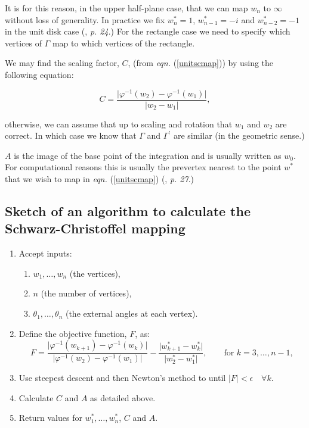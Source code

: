 \documentclass[a4paper,10pt]{amsart}
\newcommand{\sch}{Schwarz-Christoffel }
\newcommand{\eqn}[1]{\emph{eqn.} (\ref{#1})}
\newcommand{\phiinv}{\phi^{-1}}
\renewcommand{\phi}{\varphi}
\begin{document}
It is for this reason, in the upper half-plane case, that we can map $w_n$ to $\infty$ without loss of generality. In practice we fix $w^*_n=1$, $w^*_{n-1}=-i$ and $w^*_{n-2}=-1$ in the unit disk case (\cite{driscoll}, \emph{p. 24}.) For the rectangle case we need to specify which vertices of $\Gamma$ map to which vertices of the rectangle.

We may find the scaling factor, $C$, (from \eqn{unitscmap}) by using the following equation:

\begin{equation}
C=\frac{\vert \phiinv(w_2)-\phiinv(w_1)\vert}{\vert w_2 - w_1\vert},
\end{equation}

otherwise, we can assume that up to scaling and rotation that $w_1$ and $w_2$ are correct. In which case we know that $\Gamma$ and $\Gamma^\prime$ are similar (in the geometric sense.) 

$A$ is the image of the base point of the integration and is usually written as $w_0$. For computational reasons this is usually the prevertex nearest to the point $w^*$ that we wish to map in \eqn{unitscmap}  (\cite{driscoll}, \emph{p. 27}.)


\subsection{Sketch of an algorithm to calculate the \sch mapping}
\label{algorithmsketch}
\begin{enumerate}
\item Accept inputs:
   \begin{enumerate} 
      \item $w_1,\dots,w_n$ (the vertices),
      \item $n$ (the number of vertices),
      \item $\theta_1,\dots,\theta_n$ (the external angles at each vertex).
   \end{enumerate}
\item Define the objective function, $F$, as:
 \begin{equation*}
F=\frac{\vert \phiinv(w_{k+1}) -  \phiinv(w_k) \vert}{\vert \phiinv(w_2)-\phiinv(w_1)\vert} - \frac{\vert w^*_{k+1} - w^*_k\vert}{\vert w^*_2 - w^*_1\vert}, \qquad \text{for } k=3,\dots,n-1,
 \end{equation*}
\item Use steepest descent and then Newton's method to until $\vert F\vert < \epsilon \quad \forall k$. \item Calculate $C$ and $A$ as detailed above.
\item Return values for $w^*_1,\dots,w^*_n$, $C$ and $A$.
\end{enumerate}
\end{document}
